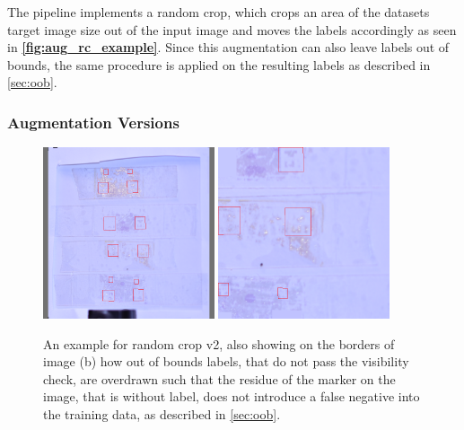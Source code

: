 \documentclass[10pt]{book}
\newcommand{\figureref}[1]{\textbf{\autoref{#1}}}
\begin{document}
The pipeline implements a random crop, which crops an area of the datasets target image size out of the input image and moves the labels accordingly as seen in \figureref{fig:aug_rc_example}. Since this augmentation can also leave labels out of bounds, the same procedure is applied on the resulting labels as described in \autoref{sec:oob}.

\subsubsection{Augmentation Versions}

\begin{figure}
  \centering
     {\includegraphics[width=0.45\textwidth]{image/aug_rc2_before}}
     {\includegraphics[width=0.45\textwidth]{image/aug_rc2_after}}
  \caption{An example for random crop v2, also showing on the borders of image (b) how out of bounds labels, that do not pass the visibility check, are overdrawn such that the residue of the marker on the image, that is without label, does not introduce a false negative into the training data, as described in \autoref{sec:oob}.}
  \label{fig:aug_rc2_example}
\end{figure}
\end{document}
